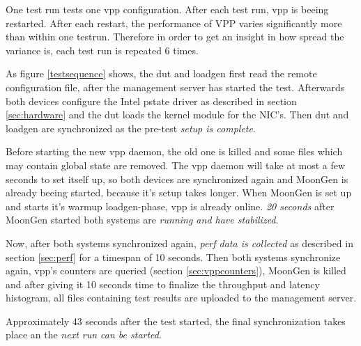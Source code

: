 One test run tests one vpp configuration. After each test run, vpp is
beeing restarted. After each restart, the performance of VPP varies
significantly more than within one testrun. Therefore in order to get
an insight in how spread the variance is, each test run is repeated 6
times. 

As figure \ref{testsequence} shows, the \Ac{dut} and \Ac{loadgen}
first read the remote configuration file, after the management server
has started the test. Afterwards both devices configure the Intel
pstate driver  as described in section \ref{sec:hardware} and the
\Ac{dut} loads the kernel module for the NIC's. Then \Ac{dut} and
\Ac{loadgen} are synchronized as the pre-test \textit{setup is
complete}.

Before starting the new \Ac{vpp} daemon, the old one is killed and
some files which may contain global state are removed. The \Ac{vpp}
daemon will take at most a few seconds to set itself up, so both
devices are synchronized again and MoonGen is already beeing started,
because it's setup takes longer. When MoonGen is set up and starts
it's warmup loadgen-phase, \Ac{vpp} is already online. \textit{20
seconds} after MoonGen started both systems are \textit{running and
have stabilized}.

Now, after both systems synchronized again, \textit{\Ac{perf} data is
collected} as described in section \ref{sec:perf} for a timespan of 10
seconds. Then both systems synchronize again, \Ac{vpp}'s counters are
queried (section \ref{sec:vppcounters}), MoonGen is killed and after
giving it 10 seconds time to finalize the throughput and latency
histogram, all files containing test results are uploaded to the
management server.

Approximately 43 seconds after the test started, the final
synchronization takes place an the \textit{next run can be started}.

